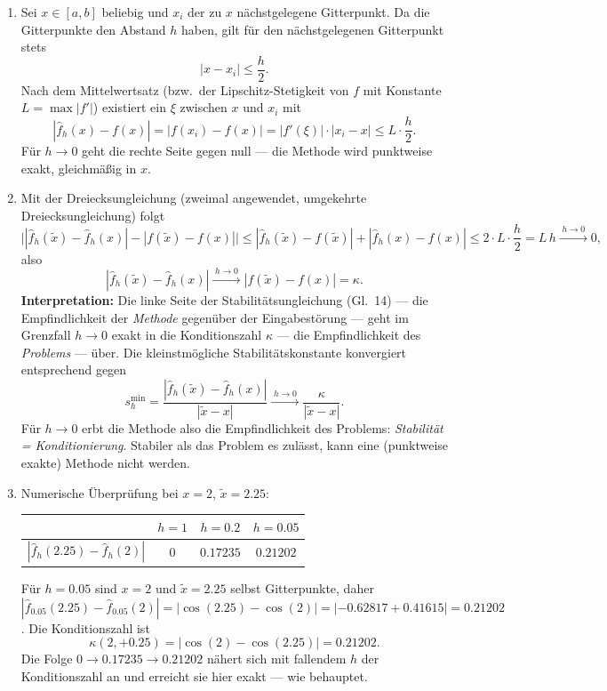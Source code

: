 \documentclass[a4paper,11pt]{scrartcl}
\begin{document}
\begin{enumerate}[label=(\alph*)]
  \item Sei $x \in [a,b]$ beliebig und $x_i$ der zu $x$ nächstgelegene Gitterpunkt. Da die Gitterpunkte den Abstand $h$ haben, gilt für den nächstgelegenen Gitterpunkt stets
  \[ |x - x_i| \leq \frac{h}{2}. \]
  Nach dem Mittelwertsatz (bzw.\ der Lipschitz-Stetigkeit von $f$ mit Konstante $L = \max |f'|$) existiert ein $\xi$ zwischen $x$ und $x_i$ mit
  \[ \left| \hat{f}_h(x) - f(x) \right| = \left| f(x_i) - f(x) \right| = |f'(\xi)| \cdot |x_i - x| \leq L \cdot \frac{h}{2}. \]
  Für $h \to 0$ geht die rechte Seite gegen null --- die Methode wird punktweise exakt, gleichmäßig in $x$.
  \item Mit der Dreiecksungleichung (zweimal angewendet, \glqq umgekehrte\grqq{} Dreiecksungleichung) folgt
  \[ \Big| \left| \hat{f}_h(\tilde{x}) - \hat{f}_h(x) \right| - \left| f(\tilde{x}) - f(x) \right| \Big|
     \leq \left| \hat{f}_h(\tilde{x}) - f(\tilde{x}) \right| + \left| \hat{f}_h(x) - f(x) \right|
     \leq 2 \cdot L \cdot \frac{h}{2} = L \, h \xrightarrow{\;h \to 0\;} 0, \]
  also
  \[ \left| \hat{f}_h(\tilde{x}) - \hat{f}_h(x) \right| \xrightarrow{\;h \to 0\;} \left| f(\tilde{x}) - f(x) \right| = \kappa. \]
  \textbf{Interpretation:} Die linke Seite der Stabilitätsungleichung (Gl.~14) --- die Empfindlichkeit der \emph{Methode} gegenüber der Eingabestörung --- geht im Grenzfall $h \to 0$ exakt in die Konditionszahl $\kappa$ --- die Empfindlichkeit des \emph{Problems} --- über. Die kleinstmögliche Stabilitätskonstante konvergiert entsprechend gegen
  \[ s_h^{\min} = \frac{\left| \hat{f}_h(\tilde{x}) - \hat{f}_h(x) \right|}{|\tilde{x} - x|} \xrightarrow{\;h \to 0\;} \frac{\kappa}{|\tilde{x} - x|}. \]
  Für $h \to 0$ erbt die Methode also die Empfindlichkeit des Problems: \emph{Stabilität = Konditionierung}. Stabiler als das Problem es zulässt, kann eine (punktweise exakte) Methode nicht werden.
  \item Numerische Überprüfung bei $x = 2$, $\tilde{x} = 2.25$:
  \begin{center}
  \begin{tabular}{lccc}
  \toprule
   & $h = 1$ & $h = 0.2$ & $h = 0.05$ \\
  \midrule
  $\left| \hat{f}_h(2.25) - \hat{f}_h(2) \right|$ & $0$ & $0.17235$ & $0.21202$ \\
  \bottomrule
  \end{tabular}
  \end{center}
  Für $h = 0.05$ sind $x = 2$ und $\tilde{x} = 2.25$ selbst Gitterpunkte, daher $\left|\hat{f}_{0.05}(2.25) - \hat{f}_{0.05}(2)\right| = |\cos(2.25) - \cos(2)| = |-0.62817 + 0.41615| = 0.21202$. Die Konditionszahl ist
  \[ \kappa(2, +0.25) = |\cos(2) - \cos(2.25)| = 0.21202. \]
  Die Folge $0 \to 0.17235 \to 0.21202$ nähert sich mit fallendem $h$ der Konditionszahl an und erreicht sie hier exakt --- wie behauptet.
\end{enumerate}
\end{document}
